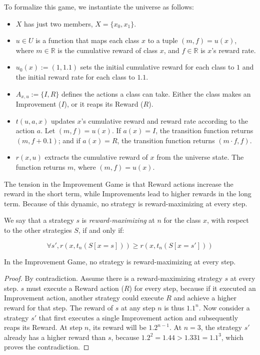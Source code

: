 To formalize this game, we instantiate the universe as follows:

\begin{itemize}
  \item $X$ has just two members, $X = \{x_0, x_1\}$.
  \item $u \in U$ is a function that maps each class $x$ to a tuple $(m, f) =
          u(x)$, where $m \in \mathbb{R}$ is the cumulative reward of class
        $x$, and $f \in \mathbb{R}$ is $x$'s reward rate.
  \item $u_0(x) := (1, 1.1)$ sets the initial cumulative reward for each
        class to $1$ and the initial reward rate for each class to $1.1$.
  \item $A_{x, u} := \{I,R\}$ defines the actions a class can
        take. Either the class makes an Improvement ($I$),
        or it reaps its Reward ($R$).
  \item $t(u,a,x)$ updates $x$'s cumulative reward and reward rate
        according to the action $a$. Let $(m,f) = u(x)$. If $a(x) = I$, the
        transition function returns $(m,f + 0.1)$; and if $a(x) = R$, the
        transition function returns $(m \cdot f,f)$.
  \item $r(x, u)$ extracts the cumulative reward of $x$ from the
        universe state. The function returns $m$, where $(m, f) = u(x)$.
\end{itemize}

The tension in the Improvement Game is that Reward actions increase the reward
in the short term, while Improvements lead to higher rewards in the long term.
Because of this dynamic, no strategy is reward-maximizing at every step.

We say that a strategy $s$ is \emph{reward-maximizing} at $n$ for the class $x$,
with respect to the other strategies $S$, if and only if:

\begin{equation}
  \forall s', r (x, t_n(S[x=s])) \ge r (x, t_n(S[x=s']))
\end{equation}

\begin{theorem}
  In the Improvement Game, no strategy is reward-maximizing at every step.
\end{theorem}

\begin{proof}
  By contradiction. Assume there is a reward-maximizing strategy $s$ at every
  step. $s$ must execute a Reward action ($R$) for every step, because if it
  executed an Improvement action, another strategy could execute $R$ and achieve
  a higher reward for that step. The reward of $s$ at any step $n$ is thus
  $1.1^n$. Now consider a strategy $s'$ that first executes a single Improvement
  action and subsequently reaps its Reward. At step $n$, its reward will be
  $1.2^{n-1}$. At $n = 3$, the strategy $s'$ already has a higher reward than
  $s$, because $1.2^2 = 1.44 > 1.331 = 1.1^3$, which proves the contradiction.
\end{proof}

